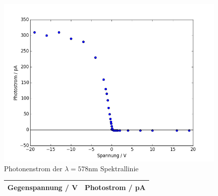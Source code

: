 \begin{figure}[h!]
	\centering
	\includegraphics[width=\textwidth]{build/OrangeWellenlange.png}
	\caption{Photonenstrom der $\lambda = 578 \si{\nano\meter}$ Spektrallinie}
	\label{fig:orange}
\end{figure}

\begin{figure}[h!]
	\centering
	\begin{tabular}{c|c}
		Gegenspannung / V & Photostrom / \si{\pico\ampere}  \\
		\hline
		
	\end{tabular}
	\label{tab:orange}
\end{figure}

	
